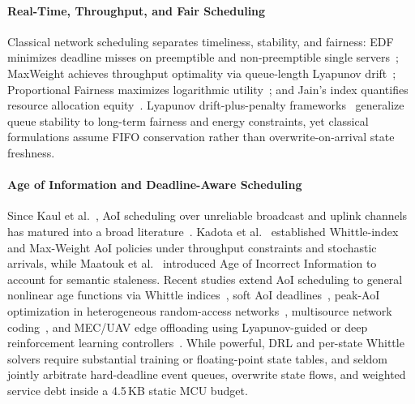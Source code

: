 \documentclass[journal]{IEEEtran}
\begin{document}
\paragraph{Real-Time, Throughput, and Fair Scheduling}
Classical network scheduling separates timeliness, stability, and fairness: EDF minimizes deadline misses on preemptible and non-preemptible single servers~\cite{liu1973scheduling}; MaxWeight achieves throughput optimality via queue-length Lyapunov drift~\cite{tassiulas1992stability,neely2010stochastic}; Proportional Fairness maximizes logarithmic utility~\cite{kelly1998rate}; and Jain's index quantifies resource allocation equity~\cite{jain1984quantitative}. Lyapunov drift-plus-penalty frameworks~\cite{neely2010stochastic} generalize queue stability to long-term fairness and energy constraints, yet classical formulations assume FIFO conservation rather than overwrite-on-arrival state freshness.

\paragraph{Age of Information and Deadline-Aware Scheduling}
Since Kaul et al.~\cite{kaul2012realtime}, AoI scheduling over unreliable broadcast and uplink channels has matured into a broad literature~\cite{yates2021age,kahraman2024survey}. Kadota et al.~\cite{kadota2018optimizing,kadota2021minimizing} established Whittle-index and Max-Weight AoI policies under throughput constraints and stochastic arrivals, while Maatouk et al.~\cite{maatouk2020aoii} introduced Age of Incorrect Information to account for semantic staleness. Recent studies extend AoI scheduling to general nonlinear age functions via Whittle indices~\cite{tripathi2024whittle}, soft AoI deadlines~\cite{li2025soft}, peak-AoI optimization in heterogeneous random-access networks~\cite{wu2024paoi}, multisource network coding~\cite{kahraman2024coding}, and MEC/UAV edge offloading using Lyapunov-guided or deep reinforcement learning controllers~\cite{jiang2023aoi,zhao2024safe,wu2022velocity}. While powerful, DRL and per-state Whittle solvers require substantial training or floating-point state tables, and seldom jointly arbitrate hard-deadline event queues, overwrite state flows, and weighted service debt inside a 4.5\,KB static MCU budget.
\end{document}

